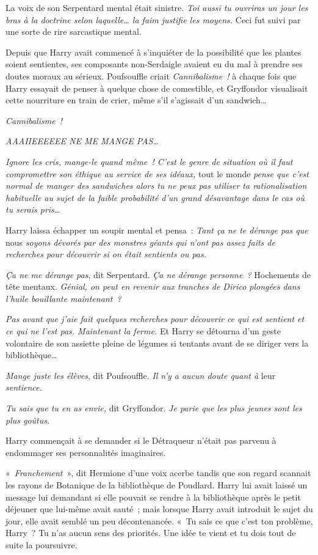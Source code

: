 La voix de son Serpentard mental était sinistre.
\emph{Toi aussi tu ouvriras un jour les bras à la doctrine selon laquelle… la faim justifie les moyens.} Ceci fut suivi par une sorte de rire sarcastique mental.

Depuis que Harry avait commencé à s'inquiéter de la possibilité que les plantes soient sentientes, ses composants non-Serdaigle avaient eu du mal à prendre ses doutes moraux au sérieux.
Poufsouffle criait \emph{Cannibalisme~!} à chaque fois que Harry essayait de penser à quelque chose de comestible, et Gryffondor visualisait cette nourriture en train de crier, même s'il s'agissait d'un sandwich…

\emph{Cannibalisme~!}

\emph{AAAIIEEEEEE NE ME MANGE PAS…}

\emph{Ignore les cris, mange-le quand même~!
C'est le genre de situation où il faut compromettre son éthique au service de ses idéaux,} tout le monde \emph{pense que c'est normal de manger des sandwiches alors tu ne peux pas utiliser ta rationalisation habituelle au sujet de la faible probabilité d'un grand désavantage dans le cas où tu serais pris…}

Harry laissa échapper un soupir mental et pensa~: \emph{Tant ça ne te dérange pas que} nous \emph{soyons dévorés par des monstres géants qui n'ont pas assez faits de recherches pour découvrir si on était sentients ou pas.}

\emph{Ça ne me dérange pas}, dit Serpentard.
\emph{Ça ne dérange personne~?} Hochements de tête mentaux.
\emph{Génial, on peut en revenir aux tranches de Dirico plongées dans l'huile bouillante maintenant~?}

\emph{Pas avant que j'aie fait quelques recherches pour découvrir ce qui est sentient et ce qui ne l'est pas.
Maintenant la ferme.} Et Harry se détourna d'un geste volontaire de son assiette pleine de légumes si tentants avant de se diriger vers la bibliothèque…

\emph{Mange juste les élèves}, dit Poufsouffle.
\emph{Il n'y a aucun doute quant à} leur \emph{sentience.}

\emph{Tu sais que tu en as envie,} dit Gryffondor.
\emph{Je parie que les plus jeunes sont les plus goûtus.}

Harry commençait à se demander si le Détraqueur n'était pas parvenu à endommager ses personnalités imaginaires.

\later

«~\emph{Franchement}~», dit Hermione d'une voix acerbe tandis que son regard scannait les rayons de Botanique de la bibliothèque de Poudlard.
Harry lui avait laissé un message lui demandant si elle pouvait se rendre à la bibliothèque après le petit déjeuner que lui-même avait sauté~; mais lorsque Harry avait introduit le sujet du jour, elle avait semblé un peu décontenancée.
«~Tu sais ce que c'est ton problème, Harry~?
Tu n'as aucun sens des priorités.
Une idée te vient et tu dois tout de suite la poursuivre.

